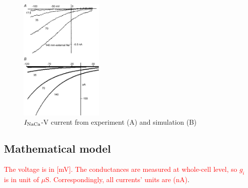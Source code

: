 \begin{figure}[hbt]
  \centerline{\includegraphics[height=6cm,
    angle=0]{./images/Noble_NaCa.eps}}
  \caption{$I_{\text{NaCa}}$-V current from experiment (A) and simulation (B)~\citep{noble2007}}
\label{fig:Noble_NaCa}
\end{figure}


% 

\subsection{Mathematical model}
\label{sec:mathematical-model-9}

\textcolor{red}{The voltage is in [mV]. The conductances are measured
  at whole-cell level, so $g_i$ is in unit of $\mu$S. Correspondingly,
  all currents' units are (nA)}.

